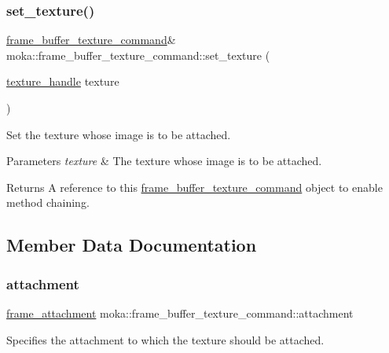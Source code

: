 \subsubsection{\texorpdfstring{set\_texture()}{set\_texture()}}
{\footnotesize\ttfamily \mbox{\hyperlink{classmoka_1_1frame__buffer__texture__command}{frame\+\_\+buffer\+\_\+texture\+\_\+command}}\& moka\+::frame\+\_\+buffer\+\_\+texture\+\_\+command\+::set\+\_\+texture (\begin{DoxyParamCaption}\item[{\mbox{\hyperlink{structmoka_1_1texture__handle}{texture\+\_\+handle}}}]{texture }\end{DoxyParamCaption})}



Set the texture whose image is to be attached. 


\begin{DoxyParams}{Parameters}
{\em texture} & The texture whose image is to be attached. \\
\hline
\end{DoxyParams}
\begin{DoxyReturn}{Returns}
A reference to this \mbox{\hyperlink{classmoka_1_1frame__buffer__texture__command}{frame\+\_\+buffer\+\_\+texture\+\_\+command}} object to enable method chaining. 
\end{DoxyReturn}


\subsection{Member Data Documentation}
\mbox{\label{classmoka_1_1frame__buffer__texture__command_af5113c5b0be55658fdd03b2823dd5038}} 
\subsubsection{\texorpdfstring{attachment}{attachment}}
{\footnotesize\ttfamily \mbox{\hyperlink{namespacemoka_a0a44ecbb877dec1107d9915dc95c58d1}{frame\+\_\+attachment}} moka\+::frame\+\_\+buffer\+\_\+texture\+\_\+command\+::attachment}

Specifies the attachment to which the texture should be attached. \mbox{\label{classmoka_1_1frame__buffer__texture__command_abf25ce4275230e90c02eb7b0009f59de}} 
